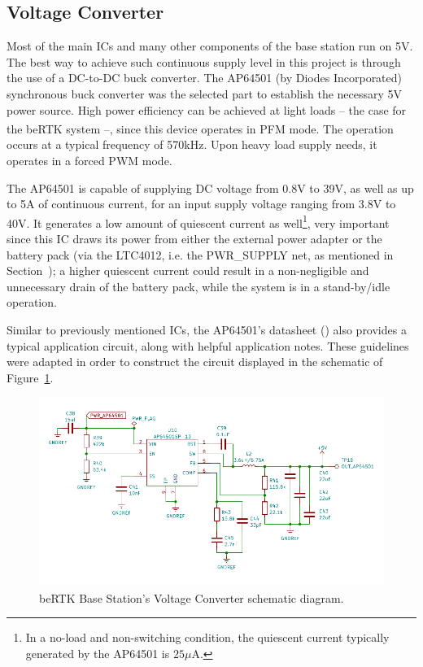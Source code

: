 

\subsection{Voltage Converter}\label{sec:3214_AP64501}

Most of the main ICs and many other components of the base station run on 5V. The best way to achieve such continuous supply level in this project is through the use of a DC-to-DC buck converter. The AP64501 (by Diodes Incorporated) synchronous buck converter was the selected part to establish the necessary 5V power source. High power efficiency can be achieved at light loads -- the case for the beRTK\textsuperscript{\textregistered} system --, since this device operates in \gls{PFM} mode. The operation occurs at a typical frequency of 570kHz. Upon heavy load supply needs, it operates in a forced PWM mode.

The AP64501 is capable of supplying DC voltage from 0.8V to 39V, as well as up to 5A of continuous current, for an input supply voltage ranging from 3.8V to 40V. It generates a low amount of quiescent current as well\footnote[10]{In a no-load and non-switching condition, the quiescent current typically generated by the AP64501 is $25 \mu$A.}, very important since this IC draws its power from either the external power adapter or the battery pack (via the LTC4012, i.e. the PWR\_SUPPLY net, as mentioned in Section~\cite{sec:3213_SWITCH}); a higher quiescent current could result in a non-negligible and unnecessary drain of the battery pack, while the system is in a stand-by/idle operation.

Similar to previously mentioned ICs, the AP64501's datasheet (\cite{AP64501}) also provides a typical application circuit, along with helpful application notes. These guidelines were adapted in order to construct the circuit displayed in the schematic of Figure~\ref{fig:AP64501_circuit}.

\begin{figure}[h]
	\centering
	\includegraphics[width=1.0\textwidth]{Chapters/Figures/chapter3/Voltage_Converter.pdf}
	\caption{beRTK\textsuperscript{\textregistered} Base Station's Voltage Converter schematic diagram.}
	\label{fig:AP64501_circuit}
\end{figure}

